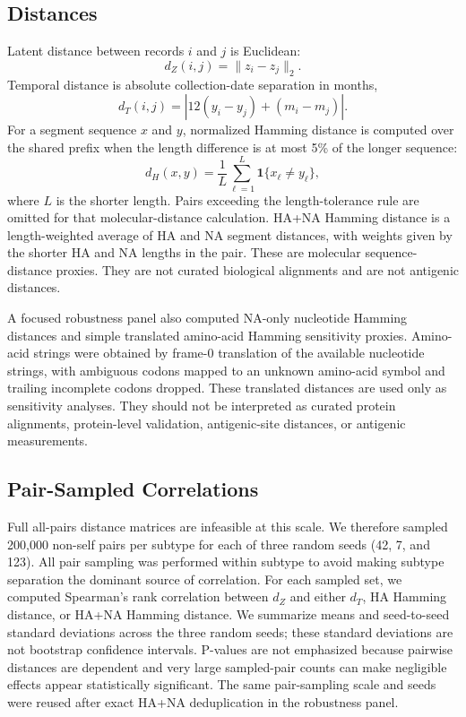 \documentclass[11pt]{article}
\begin{document}
\subsection{Distances}

Latent distance between records $i$ and $j$ is Euclidean:
\[
d_Z(i,j)=\lVert z_i-z_j\rVert_2.
\]
Temporal distance is absolute collection-date separation in months,
\[
d_T(i,j)=\left|12(y_i-y_j)+(m_i-m_j)\right|.
\]
For a segment sequence $x$ and $y$, normalized Hamming distance is computed over the shared prefix when the length difference is at most 5\% of the longer sequence:
\[
d_H(x,y)=\frac{1}{L}\sum_{\ell=1}^{L}\mathbf{1}\{x_\ell\neq y_\ell\},
\]
where $L$ is the shorter length. Pairs exceeding the length-tolerance rule are omitted for that molecular-distance calculation. HA+NA Hamming distance is a length-weighted average of HA and NA segment distances, with weights given by the shorter HA and NA lengths in the pair. These are molecular sequence-distance proxies. They are not curated biological alignments and are not antigenic distances.

A focused robustness panel also computed NA-only nucleotide Hamming distances and simple translated amino-acid Hamming sensitivity proxies. Amino-acid strings were obtained by frame-0 translation of the available nucleotide strings, with ambiguous codons mapped to an unknown amino-acid symbol and trailing incomplete codons dropped. These translated distances are used only as sensitivity analyses. They should not be interpreted as curated protein alignments, protein-level validation, antigenic-site distances, or antigenic measurements.

\subsection{Pair-Sampled Correlations}

Full all-pairs distance matrices are infeasible at this scale. We therefore sampled 200,000 non-self pairs per subtype for each of three random seeds (42, 7, and 123). All pair sampling was performed within subtype to avoid making subtype separation the dominant source of correlation. For each sampled set, we computed Spearman's rank correlation \cite{spearman1904} between $d_Z$ and either $d_T$, HA Hamming distance, or HA+NA Hamming distance. We summarize means and seed-to-seed standard deviations across the three random seeds; these standard deviations are not bootstrap confidence intervals. P-values are not emphasized because pairwise distances are dependent and very large sampled-pair counts can make negligible effects appear statistically significant. The same pair-sampling scale and seeds were reused after exact HA+NA deduplication in the robustness panel.
\end{document}
